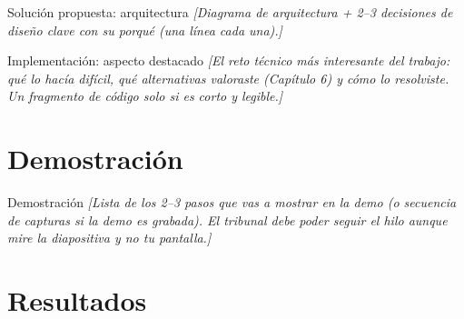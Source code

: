 \documentclass[11pt, aspectratio=169]{beamer}
\newcommand{\ph}[1]{\texorpdfstring{\textcolor{grisplaceholder}{\textit{[#1]}}}{[#1]}}
\begin{document}
\begin{frame}{Solución propuesta: arquitectura}
  \ph{Diagrama de arquitectura + 2--3 decisiones de diseño clave con su
  porqué (una línea cada una).}
\end{frame}

\begin{frame}{Implementación: aspecto destacado}
  \ph{El reto técnico más interesante del trabajo: qué lo hacía
  difícil, qué alternativas valoraste (Capítulo 6) y cómo lo
  resolviste. Un fragmento de código solo si es corto y legible.}
\end{frame}

\section{Demostración}

\begin{frame}{Demostración}
  \ph{Lista de los 2--3 pasos que vas a mostrar en la demo (o
  secuencia de capturas si la demo es grabada). El tribunal debe poder
  seguir el hilo aunque mire la diapositiva y no tu pantalla.}
\end{frame}

\section{Resultados}
\end{document}
